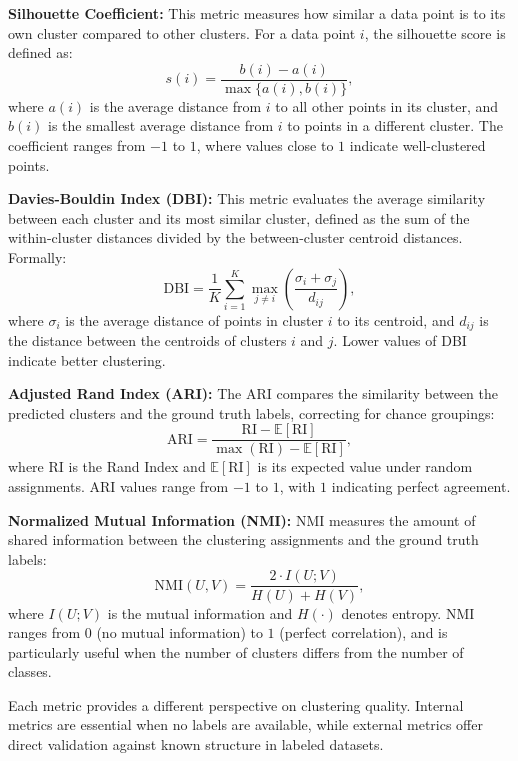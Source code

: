 \textbf{Silhouette Coefficient:} This metric measures how similar a data point is to
its own cluster compared to other clusters. For a data point $i$, the silhouette score
is defined as:
\begin{equation}
    s(i) = \frac{b(i) - a(i)}{\max\{a(i), b(i)\}},
\end{equation}
where $a(i)$ is the average distance from $i$ to all other points in its
cluster, and $b(i)$ is the smallest average distance from $i$ to points in a
different cluster. The coefficient ranges from $-1$ to $1$, where values close
to $1$ indicate well-clustered points.

\textbf{Davies-Bouldin Index (DBI):} This metric evaluates the average similarity between each
cluster and its most similar cluster, defined as the sum of the within-cluster distances divided
by the between-cluster centroid distances. Formally:
\begin{equation}
    \text{DBI} = \frac{1}{K} \sum_{i=1}^{K} \max_{j \ne i} \left( \frac{\sigma_i + \sigma_j}{d_{ij}} \right),
\end{equation}
where $\sigma_i$ is the average distance of points in cluster $i$ to its
centroid, and $d_{ij}$ is the distance between the centroids of clusters $i$
and $j$. Lower values of DBI indicate better clustering.

\textbf{Adjusted Rand Index (ARI):} The ARI compares the similarity between the predicted clusters
and the ground truth labels, correcting for chance groupings:
\begin{equation}
    \text{ARI} = \frac{\text{RI} - \mathbb{E}[\text{RI}]}{\max(\text{RI}) - \mathbb{E}[\text{RI}]},
\end{equation}
where $\text{RI}$ is the Rand Index and $\mathbb{E}[\text{RI}]$ is its expected
value under random assignments. ARI values range from $-1$ to $1$, with $1$
indicating perfect agreement.

\textbf{Normalized Mutual Information (NMI):} NMI measures the amount of shared information
between the clustering assignments and the ground truth labels:
\begin{equation}
    \text{NMI}(U, V) = \frac{2 \cdot I(U; V)}{H(U) + H(V)},
\end{equation}
where $I(U; V)$ is the mutual information and $H(\cdot)$ denotes entropy. NMI
ranges from $0$ (no mutual information) to $1$ (perfect correlation), and is
particularly useful when the number of clusters differs from the number of
classes.

Each metric provides a different perspective on clustering quality. Internal
metrics are essential when no labels are available, while external metrics
offer direct validation against known structure in labeled datasets.

